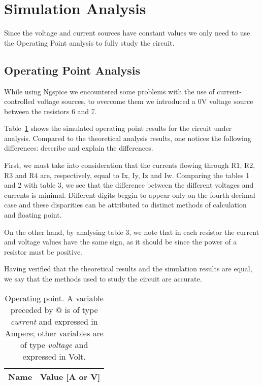 \section{Simulation Analysis}
\label{sec:simulation}
Since the voltage and current sources have constant values we only need to use the Operating Point analysis to fully study the circuit.

\subsection{Operating Point Analysis}

While using Ngspice we encountered some problems with the use of current-controlled voltage sources, to overcome them we introduced a 0V voltage source between the resistors 6 and 7.

Table~\ref{tab:op} shows the simulated operating point results for the circuit
under analysis. Compared to the theoretical analysis results, one notices the
following differences: describe and explain the differences.

First, we must take into consideration that the currents flowing through R1, R2, R3 and R4 are, respectively, equal to Ix, Iy, Iz and Iw.
Comparing the tables 1 and 2 with table 3, we see that the difference between the different voltages and currents is minimal. Different digits beggin to appear only on the fourth decimal case and these disparities can be attributed to distinct methods of calculation and floating point.\par
On the other hand, by analysing table 3, we note that in each resistor the current and voltage values have the same sign, as it should be since the power of a resistor must be positive. \par
Having verified that the theoretical results and the simulation results are equal, we say that the methods used to study the circuit are accurate.


\begin{table}[h]
  \centering
  \begin{tabular}{|l|r|}
    \hline    
    {\bf Name} & {\bf Value [A or V]} \\ \hline
    
  \end{tabular}
  \caption{Operating point. A variable preceded by @ is of type {\em current}
    and expressed in Ampere; other variables are of type {\it voltage} and expressed in
    Volt.}
  \label{tab:op}
\end{table}



